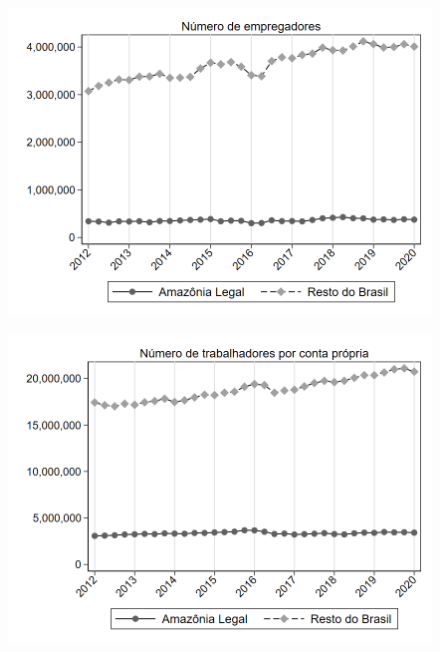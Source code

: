 \begin{frame}[label=_estrutura_emprego_n_empregador]{}
\textit{\hyperlink{_estrutura_emprego}{}}
\begin{figure}
  \centering
  \includegraphics[width=1.0\linewidth]{../../analysis/output/estrutura_emprego/_estrutura_emprego_n_empregador.png}
  \caption{}
  \label{fig:_estrutura_emprego_n_empregador}
\end{figure}
\end{frame}



\begin{frame}[label=_estrutura_emprego_n_cpropria]{}
\textit{\hyperlink{_estrutura_emprego}{}}
\begin{figure}
  \centering
  \includegraphics[width=1.0\linewidth]{../../analysis/output/estrutura_emprego/_estrutura_emprego_n_cpropria.png}
  \caption{}
  \label{fig:_estrutura_emprego_n_cpropria}
\end{figure}
\end{frame}

